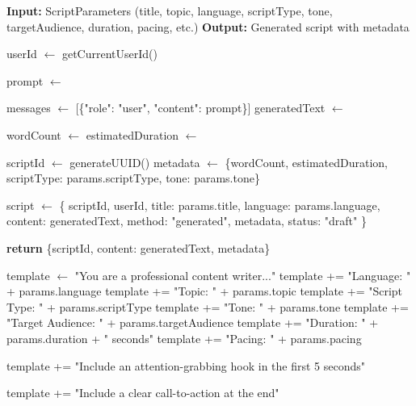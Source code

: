 \begin{algorithm}[H]
\caption{AI-Powered Script Generation}
\begin{algorithmic}[1]
\State \textbf{Input:} ScriptParameters (title, topic, language, scriptType, tone, targetAudience, duration, pacing, etc.)
\State \textbf{Output:} Generated script with metadata

    \State userId $\gets$ getCurrentUserId()
    \State {}
    
    \State prompt $\gets$ 
    
    \State messages $\gets$ [\{"role": "user", "content": prompt\}]
    \State generatedText $\gets$ 
    
    \State wordCount $\gets$ 
    \State estimatedDuration $\gets$ 
    
    \State scriptId $\gets$ generateUUID()
    \State metadata $\gets$ \{wordCount, estimatedDuration, scriptType: params.scriptType, tone: params.tone\}
    
    \State script $\gets$ \{
        \State \quad scriptId, userId, title: params.title, language: params.language,
        \State \quad content: generatedText, method: "generated", metadata, status: "draft"
    \State \}
    
    \State {}
    
    \State \textbf{return} \{scriptId, content: generatedText, metadata\}
\EndProcedure

    \State template $\gets$ "You are a professional content writer..."
    \State template += "Language: " + params.language
    \State template += "Topic: " + params.topic
    \State template += "Script Type: " + params.scriptType
    \State template += "Tone: " + params.tone
    \State template += "Target Audience: " + params.targetAudience
    \State template += "Duration: " + params.duration + " seconds"
    \State template += "Pacing: " + params.pacing
    
        \State template += "Include an attention-grabbing hook in the first 5 seconds"
    \EndIf
    
        \State template += "Include a clear call-to-action at the end"
    \EndIf
    

\end{algorithmic}
\end{algorithm}
